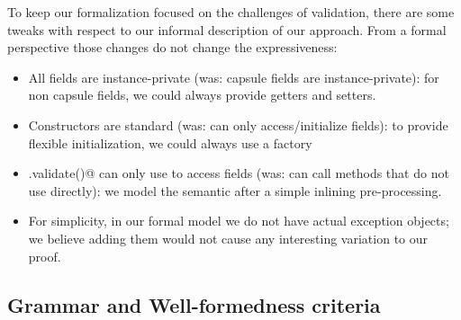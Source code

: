 To keep our formalization focused on
the challenges of validation, 
there are some
tweaks with respect to our informal description of our approach.
From a formal perspective 
those changes do not change the expressiveness:
\begin{itemize}
\item All fields are instance-private (was: capsule fields are instance-private):
for non capsule fields, we could always provide getters and setters.
\item Constructors are standard (was: can only access/initialize fields): to provide flexible initialization, we could always use a factory
\item \Q@.validate()@ can only use \Q@this@ to access fields (was: can call methods that do not use \Q@this@ directly):
we model the semantic after a simple inlining pre-processing.
\item For simplicity, in our formal model we do not have actual exception objects;
we believe adding them would not cause any interesting
variation to our proof.
\end{itemize}


\subsection{Grammar and Well-formedness criteria}


